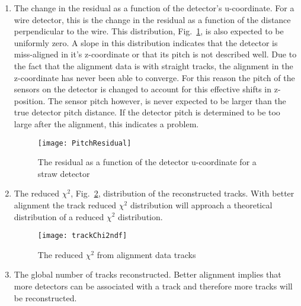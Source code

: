 \begin{enumerate}[label=\roman*)]
\item The change in the residual as a function of the detector's u-coordinate.
  For a wire detector, this is the change in the residual as a function of the
  distance perpendicular to the wire.  This distribution,
  Fig.~\ref{fig::PitchResidual}, is also expected to be uniformly zero.  A slope
  in this distribution indicates that the detector is miss-aligned in it's
  z-coordinate or that its pitch is not described well.  Due to the fact that
  the alignment data is with straight tracks, the alignment in the z-coordinate
  has never been able to converge.  For this reason the pitch of the sensors on
  the detector is changed to account for this effective shifts in z-position.
  The sensor pitch however, is never expected to be larger than the true
  detector pitch distance.  If the detector pitch is determined to be too large
  after the alignment, this indicates a problem.
  \begin{figure}[h!t]
    \centering \texttt{[image: PitchResidual]}
    \caption{The residual as a function of the detector u-coordinate for a straw
      detector}
    \label{fig::PitchResidual}
  \end{figure}

\item The reduced $\chi^2$, Fig.~\ref{fig::trackChi2ndf}, distribution of the
  reconstructed tracks.  With better alignment the track reduced $\chi^2$
  distribution will approach a theoretical distribution of a reduced $\chi^2$
  distribution.
  \begin{figure}[h!t]
    \centering \texttt{[image: trackChi2ndf]}
    \caption{The reduced $\chi^2$ from alignment data tracks}
    \label{fig::trackChi2ndf}
  \end{figure}
  
\item The global number of tracks reconstructed.  Better alignment
  implies that more detectors can be associated with a track and therefore more
  tracks will be reconstructed.
\end{enumerate}

